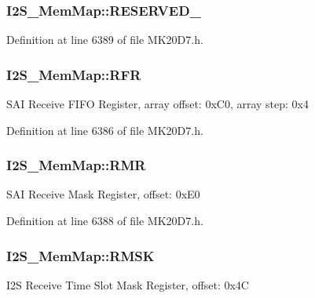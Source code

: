 \subsubsection[{\texorpdfstring{R\+E\+S\+E\+R\+V\+E\+D\+\_\+7}{RESERVED_7}}]{ I2\+S\+\_\+\+Mem\+Map\+::\+R\+E\+S\+E\+R\+V\+E\+D\+\_}\hypertarget{struct_i2_s___mem_map_aca9b74d3ebb30822a9033066cc359af4}{}\label{struct_i2_s___mem_map_aca9b74d3ebb30822a9033066cc359af4}


Definition at line 6389 of file M\+K20\+D7.\+h.

\subsubsection[{\texorpdfstring{R\+FR}{RFR}}]{ I2\+S\+\_\+\+Mem\+Map\+::\+R\+FR}\hypertarget{struct_i2_s___mem_map_a8736cd6aa5c22429d638fb54e3c7504c}{}\label{struct_i2_s___mem_map_a8736cd6aa5c22429d638fb54e3c7504c}
S\+AI Receive F\+I\+FO Register, array offset\+: 0x\+C0, array step\+: 0x4 

Definition at line 6386 of file M\+K20\+D7.\+h.

\subsubsection[{\texorpdfstring{R\+MR}{RMR}}]{ I2\+S\+\_\+\+Mem\+Map\+::\+R\+MR}\hypertarget{struct_i2_s___mem_map_af8727047a9c7ea717dcfb8f94061b6a3}{}\label{struct_i2_s___mem_map_af8727047a9c7ea717dcfb8f94061b6a3}
S\+AI Receive Mask Register, offset\+: 0x\+E0 

Definition at line 6388 of file M\+K20\+D7.\+h.

\subsubsection[{\texorpdfstring{R\+M\+SK}{RMSK}}]{ I2\+S\+\_\+\+Mem\+Map\+::\+R\+M\+SK}\hypertarget{struct_i2_s___mem_map_a66200d6c7f38f46b49f1891862928e26}{}\label{struct_i2_s___mem_map_a66200d6c7f38f46b49f1891862928e26}
I2S Receive Time Slot Mask Register, offset\+: 0x4C 

